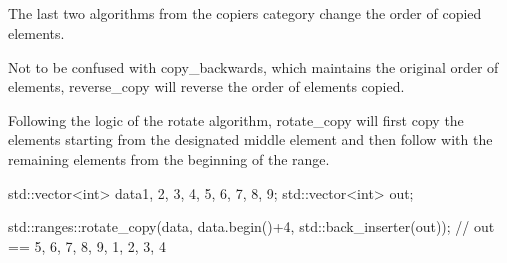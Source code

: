 \subsection{\texorpdfstring{}{\texttt{std::rotate\_copy}}}



The last two algorithms from the copiers category change the order of copied elements.



Not to be confused with copy\_backwards, which maintains the original order of elements, reverse\_copy will reverse the order of elements copied.





Following the logic of the rotate algorithm, rotate\_copy will first copy the elements starting from the designated middle element and then follow with the remaining elements from the beginning of the range.

\begin{box-note}
\begin{cppcode}
std::vector<int> data{1, 2, 3, 4, 5, 6, 7, 8, 9};
std::vector<int> out;

std::ranges::rotate_copy(data, data.begin()+4, std::back_inserter(out));
// out == { 5, 6, 7, 8, 9, 1, 2, 3, 4 }
\end{cppcode}
\end{box-note}
